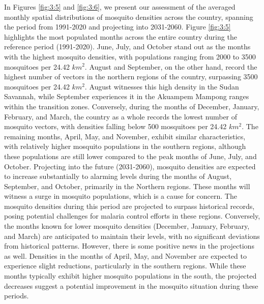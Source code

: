 \documentclass[utf8]{FrontiersinHarvard} %
\begin{document}
In Figures  \ref{fig:3:5} and \ref{fig:3:6}, we present our assessment of the averaged monthly spatial distributions of mosquito densities across the country, spanning the period from 1991-2020 and projecting into 2031-2060. Figure \ref{fig:3:5} highlights the most populated months across the entire country during the reference period (1991-2020). June, July, and October stand out as the months with the highest mosquito densities, with populations ranging from 2000 to 3500 mosquitoes per 24.42 $km^{2}$. August and September, on the other hand, record the highest number of vectors in the northern regions of the country, surpassing 3500 mosquitoes per 24.42 $km^{2}$. August witnesses this high density in the Sudan Savannah, while September experiences it in the Akuampem Mampong ranges within the transition zones. Conversely, during the months of December, January, February, and March, the country as a whole records the lowest number of mosquito vectors, with densities falling below 500 mosquitoes per 24.42 $km^{2}$. The remaining months, April, May, and November, exhibit similar characteristics, with relatively higher mosquito populations in the southern regions, although these populations are still lower compared to the peak months of June, July, and October. Projecting into the future (2031-2060), mosquito densities are expected to increase substantially to alarming levels during the months of August, September, and October, primarily in the Northern regions. These months will witness a surge in mosquito populations, which is a cause for concern. The mosquito densities during this period are projected to surpass historical records, posing potential challenges for malaria control efforts in these regions. Conversely, the months known for lower mosquito densities (December, January, February, and March) are anticipated to maintain their levels, with no significant deviations from historical patterns. However, there is some positive news in the projections as well. Densities in the months of April, May, and November are expected to experience slight reductions, particularly in the southern regions. While these months typically exhibit higher mosquito populations in the south, the projected decreases suggest a potential improvement in the mosquito situation during these periods.
\end{document}

